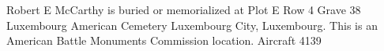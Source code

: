 \documentclass{article}
\begin{document}
\begin{multicols}{3}
Robert E McCarthy is buried or memorialized at Plot E Row 4 Grave 38 Luxembourg American Cemetery Luxembourg City, Luxembourg. This is an American Battle Monuments Commission location.
Aircraft 4139

\closearticle



\end{multicols}
\end{document}
